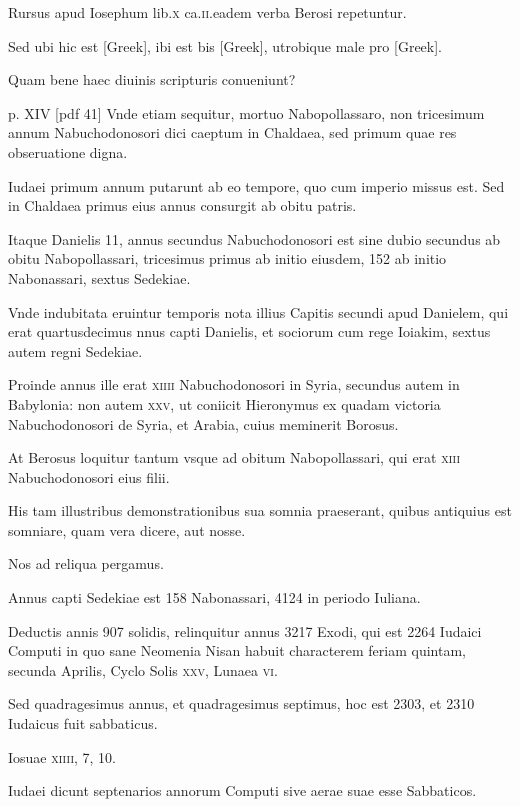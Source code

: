 \begin{parnumbers}
Rursus apud Iosephum
lib.\textsc{x} ca.\textsc{ii}.eadem verba Berosi repetuntur.

Sed ubi hic est \textgreek{[Greek]},
ibi est bis \textgreek{[Greek]}, utrobique male pro \textgreek{[Greek]}.

Quam bene haec diuinis scripturis conueniunt?

\clearpage
p. XIV [pdf 41]
Vnde etiam sequitur, mortuo Nabopollassaro, non tricesimum annum Nabuchodonosori
dici caeptum in Chaldaea, sed primum quae res obseruatione
digna.

Iudaei primum annum putarunt ab eo tempore, quo
cum imperio missus est. Sed in Chaldaea primus eius annus consurgit
ab obitu patris.

Itaque Danielis 11, annus secundus Nabuchodonosori
est sine dubio secundus ab obitu Nabopollassari, tricesimus
primus ab initio eiusdem, 152 ab initio Nabonassari, sextus
Sedekiae.

Vnde indubitata eruintur temporis nota illius Capitis secundi
apud Danielem, qui erat quartusdecimus nnus capti Danielis,
et sociorum cum rege Ioiakim, sextus autem regni Sedekiae.

Proinde annus ille erat \textsc{xiiii} Nabuchodonosori in Syria, secundus
autem in Babylonia: non autem \textsc{xxv}, ut coniicit Hieronymus
ex quadam victoria Nabuchodonosori de Syria, et Arabia, cuius
meminerit Borosus.

At Berosus loquitur tantum vsque ad obitum
Nabopollassari, qui erat \textsc{xiii} Nabuchodonosori eius filii.

His tam illustribus demonstrationibus sua somnia praeserant, quibus antiquius
est somniare, quam vera dicere, aut nosse.

Nos ad reliqua
pergamus.

Annus capti Sedekiae est 158 Nabonassari, 4124 in periodo Iuliana.

Deductis annis 907 solidis, relinquitur annus 3217
Exodi, qui est 2264 Iudaici Computi in quo sane Neomenia Nisan
habuit characterem feriam quintam, secunda Aprilis, Cyclo
Solis \textsc{xxv}, Lunaea \textsc{vi}.

Sed quadragesimus annus, et quadragesimus
septimus, hoc est 2303, et 2310 Iudaicus fuit sabbaticus.

Iosuae
\textsc{xiiii}, 7, 10.

Iudaei dicunt septenarios annorum Computi sive aerae
suae esse Sabbaticos.


\end{parnumbers}
